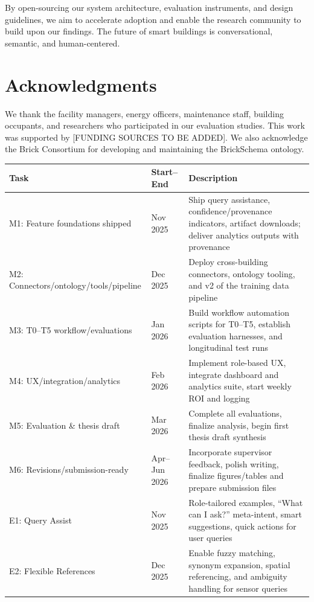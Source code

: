 \documentclass[acmlarge]{acmart}
\begin{document}
By open-sourcing our system architecture, evaluation instruments, and design guidelines, we aim to accelerate adoption and enable the research community to build upon our findings. The future of smart buildings is conversational, semantic, and human-centered.

\section*{Acknowledgments}

We thank the facility managers, energy officers, maintenance staff, building occupants, and researchers who participated in our evaluation studies. This work was supported by [FUNDING SOURCES TO BE ADDED]. We also acknowledge the Brick Consortium for developing and maintaining the BrickSchema ontology.
\newpage
\color{blue}
\begin{table}[ht]
\centering
\begin{tabular}{p{5cm} p{2cm} p{7cm}}
\toprule
\textbf{Task} & \textbf{Start–End} & \textbf{Description} \\
\midrule
M1: Feature foundations shipped & Nov 2025 & Ship query assistance, confidence/provenance indicators, artifact downloads; deliver analytics outputs with provenance \\
M2: Connectors/ontology/tools/pipeline & Dec 2025 & Deploy cross-building connectors, ontology tooling, and v2 of the training data pipeline \\
M3: T0–T5 workflow/evaluations & Jan 2026 & Build workflow automation scripts for T0–T5, establish evaluation harnesses, and longitudinal test runs \\
M4: UX/integration/analytics & Feb 2026 & Implement role-based UX, integrate dashboard and analytics suite, start weekly ROI and logging \\
M5: Evaluation \& thesis draft & Mar 2026 & Complete all evaluations, finalize analysis, begin first thesis draft synthesis \\
M6: Revisions/submission-ready & Apr--Jun 2026 & Incorporate supervisor feedback, polish writing, finalize figures/tables and prepare submission files \\
E1: Query Assist & Nov 2025 & Role-tailored examples, “What can I ask?” meta-intent, smart suggestions, quick actions for user queries \\
E2: Flexible References & Dec 2025 & Enable fuzzy matching, synonym expansion, spatial referencing, and ambiguity handling for sensor queries \\

\end{tabular}
\end{table}
\end{document}
